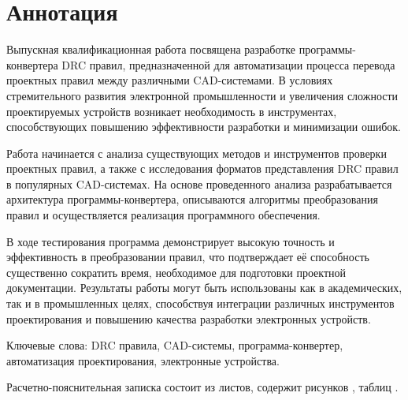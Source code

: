 
\chapter*{Аннотация}

Выпускная квалификационная работа посвящена разработке
программы-конвертера DRC правил,
предназначенной для автоматизации процесса перевода проектных правил
между различными CAD-системами.
В условиях стремительного развития электронной промышленности
и увеличения сложности проектируемых устройств возникает необходимость
в инструментах, способствующих повышению эффективности разработки
и минимизации ошибок.

Работа начинается с анализа существующих методов
и инструментов проверки проектных правил,
а также с исследования форматов представления DRC правил
в популярных CAD-системах.
На основе проведенного анализа разрабатывается архитектура
программы-конвертера, описываются алгоритмы преобразования правил
и осуществляется реализация программного обеспечения.

В ходе тестирования программа демонстрирует высокую точность
и эффективность в преобразовании правил,
что подтверждает её способность существенно сократить время,
необходимое для подготовки проектной документации.
Результаты работы могут быть использованы как в академических,
так и в промышленных целях,
способствуя интеграции различных инструментов проектирования
и повышению качества разработки электронных устройств.

Ключевые слова:
DRC правила, CAD-системы, программа-конвертер,
автоматизация проектирования, электронные устройства.

Расчетно-пояснительная записка
состоит из \pageref{lastpage} листов,
содержит
\totalfigures рисунков
, \totaltables таблиц
.

